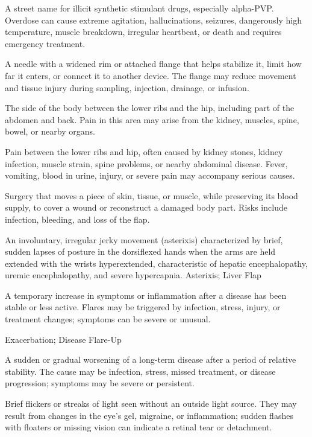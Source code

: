  A street name for illicit synthetic stimulant drugs, especially alpha-PVP. Overdose can cause extreme agitation, hallucinations, seizures, dangerously high temperature, muscle breakdown, irregular heartbeat, or death and requires emergency treatment.

 A needle with a widened rim or attached flange that helps stabilize it, limit how far it enters, or connect it to another device. The flange may reduce movement and tissue injury during sampling, injection, drainage, or infusion.

 The side of the body between the lower ribs and the hip, including part of the abdomen and back. Pain in this area may arise from the kidney, muscles, spine, bowel, or nearby organs.

 Pain between the lower ribs and hip, often caused by kidney stones, kidney infection, muscle strain, spine problems, or nearby abdominal disease. Fever, vomiting, blood in urine, injury, or severe pain may accompany serious causes.

 Surgery that moves a piece of skin, tissue, or muscle, while preserving its blood supply, to cover a wound or reconstruct a damaged body part. Risks include infection, bleeding, and loss of the flap.

 An involuntary, irregular jerky movement (asterixis) characterized by brief, sudden lapses of posture in the dorsiflexed hands when the arms are held extended with the wrists hyperextended, characteristic of hepatic encephalopathy, uremic encephalopathy, and severe hypercapnia.
\synonyms
Asterixis; Liver Flap

 A temporary increase in symptoms or inflammation after a disease has been stable or less active. Flares may be triggered by infection, stress, injury, or treatment changes; symptoms can be severe or unusual.

\synonyms
Exacerbation; Disease Flare-Up

 A sudden or gradual worsening of a long-term disease after a period of relative stability. The cause may be infection, stress, missed treatment, or disease progression; symptoms may be severe or persistent.

 Brief flickers or streaks of light seen without an outside light source. They may result from changes in the eye’s gel, migraine, or inflammation; sudden flashes with floaters or missing vision can indicate a retinal tear or detachment.

